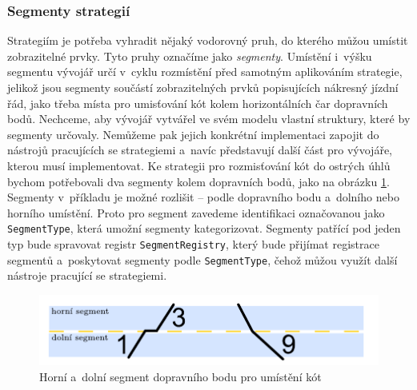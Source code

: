 \subsubsection*{Segmenty strategií}
Strategiím je potřeba vyhradit nějaký vodorovný pruh, do kterého můžou umístit zobrazitelné prvky. Tyto pruhy označíme jako \textit{segmenty}. Umístění i~výšku segmentu vývojář určí v~cyklu rozmístění před samotným aplikováním strategie, jelikož jsou segmenty součástí zobrazitelných prvků popisujících nákresný jízdní řád, jako třeba místa pro umisťování kót kolem horizontálních čar dopravních bodů. Nechceme, aby vývojář vytvářel ve svém modelu vlastní struktury, které by segmenty určovaly. Nemůžeme pak jejich konkrétní implementaci zapojit do nástrojů pracujících se strategiemi a~navíc představují další část pro vývojáře, kterou musí implementovat. Ke strategii pro rozmisťování kót do ostrých úhlů bychom potřebovali dva segmenty kolem dopravních bodů, jako na obrázku \ref{fig:segments_upper_lower}. Segmenty v~příkladu je možné rozlišit -- podle dopravního bodu a~dolního nebo horního umístění. Proto pro segment zavedeme identifikaci označovanou jako \texttt{SegmentType}, která umožní segmenty kategorizovat. Segmenty patřící pod jeden typ bude spravovat registr \texttt{SegmentRegistry}, který bude přijímat registrace segmentů a~poskytovat segmenty podle \texttt{SegmentType}, čehož můžou využít další nástroje pracující se strategiemi.

\begin{figure}[!bth]
	\centering
	\includegraphics[width=\textwidth]{../img/kap3_segment_upper_lower}
	\caption{Horní a~dolní segment dopravního bodu pro umístění kót}
	\label{fig:segments_upper_lower}
\end{figure}

